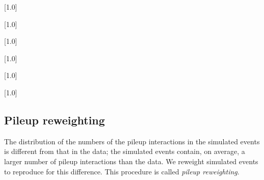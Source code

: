 \begin{table}[!p]
 \centering
{}
 \scriptsize
 \scalebox{.7}[1.0]{}
\end{table}

\begin{table}[!p]
 \centering
{}
 \scriptsize
 \scalebox{.7}[1.0]{}
\end{table}

\begin{table}[!p]
 \centering
{}
 \scriptsize
 \scalebox{.7}[1.0]{}
\end{table}

\begin{table}[!p]
 \centering
{}
 \scriptsize
 \scalebox{.7}[1.0]{}
\end{table}

\begin{table}[!p]
 \centering
 \scriptsize
 \scalebox{.7}[1.0]{}
\end{table}

\begin{table}[!p]
 \centering
 \scriptsize
 \scalebox{.7}[1.0]{}
\end{table}

\clearpage

\subsection{Pileup reweighting}

The distribution of the numbers of the pileup interactions in the
simulated events is different from that in the data; the simulated
events contain, on average, a larger number of pileup interactions than
the data. We reweight simulated events to reproduce  for this difference.
This procedure is called \textit{pileup reweighting}.

